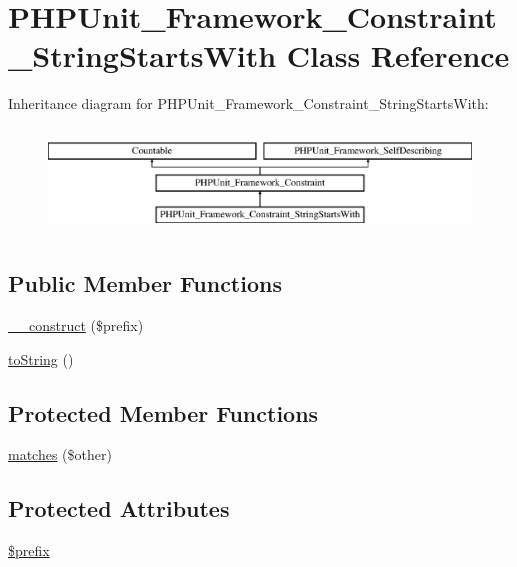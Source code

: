 \hypertarget{class_p_h_p_unit___framework___constraint___string_starts_with}{}\section{P\+H\+P\+Unit\+\_\+\+Framework\+\_\+\+Constraint\+\_\+\+String\+Starts\+With Class Reference}
\label{class_p_h_p_unit___framework___constraint___string_starts_with}
Inheritance diagram for P\+H\+P\+Unit\+\_\+\+Framework\+\_\+\+Constraint\+\_\+\+String\+Starts\+With\+:\begin{figure}[H]
\begin{center}
\leavevmode
\includegraphics[height=2.837838cm]{class_p_h_p_unit___framework___constraint___string_starts_with}
\end{center}
\end{figure}
\subsection*{Public Member Functions}
\begin{DoxyCompactItemize}
\item 
\mbox{\hyperlink{class_p_h_p_unit___framework___constraint___string_starts_with_a9ac7e8d6675c7b94adf640ae068febed}{\+\_\+\+\_\+construct}} (\$prefix)
\item 
\mbox{\hyperlink{class_p_h_p_unit___framework___constraint___string_starts_with_a5558c5d549f41597377fa1ea8a1cefa3}{to\+String}} ()
\end{DoxyCompactItemize}
\subsection*{Protected Member Functions}
\begin{DoxyCompactItemize}
\item 
\mbox{\hyperlink{class_p_h_p_unit___framework___constraint___string_starts_with_a9c9c337de483bbdbb9fa249a6c7c9cc5}{matches}} (\$other)
\end{DoxyCompactItemize}
\subsection*{Protected Attributes}
\begin{DoxyCompactItemize}
\item 
\mbox{\hyperlink{class_p_h_p_unit___framework___constraint___string_starts_with_a09e8cf95b9d29955a0bfabca9b420edc}{\$prefix}}
\end{DoxyCompactItemize}


